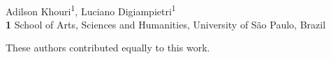 \documentclass[10pt,letterpaper]{article}
\date{}
\begin{document}
\vspace*{0.2in}

\begin{flushleft}
{\Large
\textbf{} %
}
\newline
\\
Adilson Khouri\textsuperscript{1\Yinyang},
Luciano Digiampietri\textsuperscript{1\Yinyang}
\\
\bigskip
\textbf{1} School of Arts, Sciences and Humanities, University of S\~{a}o Paulo, Brazil
\\
\bigskip

% 
%
\Yinyang These authors contributed equally to this work.






\end{flushleft}
\end{document}
